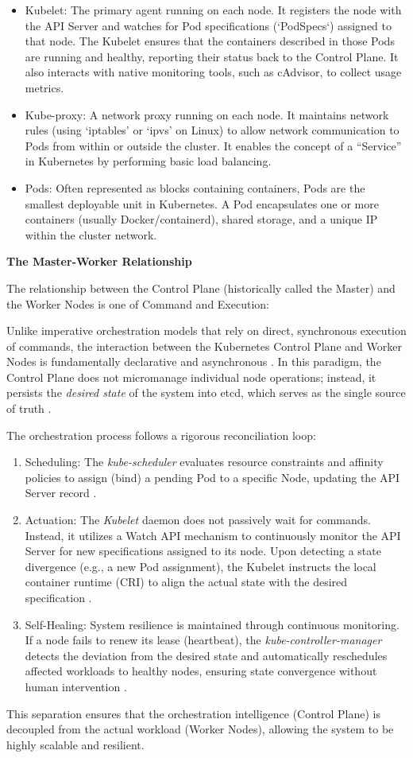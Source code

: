 \begin{itemize}
    \item Kubelet: The primary agent running on each node. It registers the node with the API Server and watches for Pod specifications (`PodSpecs`) assigned to that node. The Kubelet ensures that the containers described in those Pods are running and healthy, reporting their status back to the Control Plane. It also interacts with native monitoring tools, such as cAdvisor, to collect usage metrics.
    \item Kube-proxy: A network proxy running on each node. It maintains network rules (using `iptables' or `ipvs' on Linux) to allow network communication to Pods from within or outside the cluster. It enables the concept of a ``Service'' in Kubernetes by performing basic load balancing.
    \item Pods: Often represented as blocks containing containers, Pods are the smallest deployable unit in Kubernetes. A Pod encapsulates one or more containers (usually Docker/containerd), shared storage, and a unique IP within the cluster network.
\end{itemize}

\textbf{The Master-Worker Relationship}

The relationship between the Control Plane (historically called the Master) and the Worker Nodes is one of Command and Execution:

Unlike imperative orchestration models that rely on direct, synchronous execution of commands, the interaction between the Kubernetes Control Plane and Worker Nodes is fundamentally declarative and asynchronous \cite{burns_2016}. In this paradigm, the Control Plane does not micromanage individual node operations; instead, it persists the \textit{desired state} of the system into etcd, which serves as the single source of truth \cite{luksa_2018}.

The orchestration process follows a rigorous reconciliation loop:

\begin{enumerate}
    \item Scheduling: The \textit{kube-scheduler} evaluates resource constraints and affinity policies to assign (bind) a pending Pod to a specific Node, updating the API Server record \cite{hausenblas_2023}.
    \item Actuation: The \textit{Kubelet} daemon does not passively wait for commands. Instead, it utilizes a Watch API mechanism to continuously monitor the API Server for new specifications assigned to its node. Upon detecting a state divergence (e.g., a new Pod assignment), the Kubelet instructs the local container runtime (CRI) to align the actual state with the desired specification \cite{sayfan_2017}.
    \item Self-Healing: System resilience is maintained through continuous monitoring. If a node fails to renew its lease (heartbeat), the \textit{kube-controller-manager} detects the deviation from the desired state and automatically reschedules affected workloads to healthy nodes, ensuring state convergence without human intervention \cite{beyer_2016}.
\end{enumerate}

This separation ensures that the orchestration intelligence (Control Plane) is decoupled from the actual workload (Worker Nodes), allowing the system to be highly scalable and resilient.